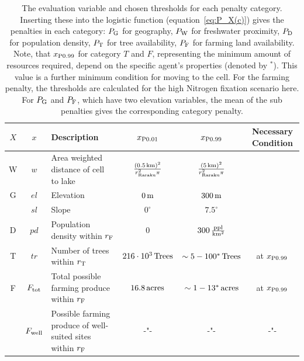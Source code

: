  \begin{table}
	\centering
	\begin{tabular}{c|c|L|c|c|S}
		$X$ & $x$& Description & $x_{\rm P0.01}$ & $x_{\rm P0.99}$ & Necessary Condition \\ \hline
		W &$w$ & Area weighted distance of cell to lake & $\frac{(0.5\, {\rm km})^2}{r_\text{Raraku}^2\pi}$ & $\frac{(5\, {\rm km})^2}{r_\text{Raraku}^2\pi}$\\
		G & $el$ & Elevation & $0\, {\rm m}$ & $300\, {\rm m}$ & \\
		& $sl$ & Slope & $0^\circ$ & $7.5^\circ$ & \\
		D & $pd$ & Population density within $r_{\rm F}$ & 0 & $300\, {\rm \frac{ppl}{km^2}}$ & \\
		T & $tr$ & Number of trees within $r_{\rm T}$ & $216\cdot 10^3 \, {\rm Trees}$ & $\sim 5-100^* \, {\rm Trees}$ &  at $x_{\rm P0.99}$\\
		F& $F_{\rm tot}$ & Total possible farming produce within $r_{\rm F}$ & $16.8 \, \rm{acres}$  & $\sim 1-13^* \, \rm{acres}$& at $x_{\rm P0.99}$\\
		& $F_{\rm well}$ & Possible farming produce of well-suited sites within $r_{\rm F}$ & -"- & -"- & -"-\\
	\end{tabular}
\caption{The evaluation variable and chosen thresholds for each penalty category.
	Inserting these into the logistic function (equation~\ref{eq:P_X(c)}) gives the penalties in each category:
	$P_{\rm G}$ for geography, $P_{\rm W}$ for freshwater proximity, $P_{\rm D}$ for population density, $P_{\rm T}$ for tree availability, $P_{\rm F}$ for farming land availability.
	Note, that $x_{\rm P0.99}$ for category $T$ and $F$, representing the minimum amount of resources required, depend on the specific agent's properties (denoted by $^*$).
	This value is a further minimum condition for moving to the cell. For the farming penalty, the thresholds are calculated for the high Nitrogen fixation scenario here.
	For $P_{\rm G}$ and $P_{\rm F}$, which have two elevation variables, the mean of the sub penalties gives the corresponding category penalty.
}
\label{tab:x01x09} 
\end{table}


